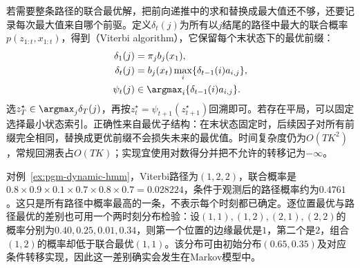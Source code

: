 若需要整条路径的联合最优解，把前向递推中的求和替换成最大值还不够，还要记录每次最大值来自哪个前驱。定义$\delta_t(j)$为所有以$j$结尾的路径中最大的联合概率$p(z_{1:t},x_{1:t})$，得到（Viterbi algorithm），它保留每个末状态下的最优前缀：
\begin{equation}
  \begin{aligned}
    \delta_1(j)&=\pi_jb_j(x_1),\\
    \delta_t(j)&=b_j(x_t)\max_i
      \{\delta_{t-1}(i)a_{i,j}\},\\
    \psi_t(j)&\in\argmax_i
      \{\delta_{t-1}(i)a_{i,j}\}.
  \end{aligned}
  \label{eq:pgm-dynamic-viterbi}
\end{equation}
选$z_T^\star\in\argmax_j\delta_T(j)$，再按$z_t^\star=\psi_{t+1}(z_{t+1}^\star)$回溯即可。若存在平局，可以固定选择最小状态索引。正确性来自最优子结构：在末状态固定时，后续因子对所有前缀完全相同，替换成更优前缀不会损失未来的最优值。时间复杂度仍为$O(TK^2)$，常规回溯表占$O(TK)$；实现宜使用对数得分并把不允许的转移记为$-\infty$。

对例~\ref{ex:pgm-dynamic-hmm}，Viterbi路径为$(1,2,2)$，联合概率是$0.8\times0.9\times0.1\times0.7\times0.8\times0.7=0.028224$，条件于观测后的路径概率约为$0.4761$。这只是所有路径中概率最高的一条，不表示每个时刻都已确定。逐位置最优与路径最优的差别也可用一个两时刻分布检验：设$(1,1),(1,2),(2,1),(2,2)$的概率分别为$0.40,0.25,0.01,0.34$，则第一个位置的边缘最优是$1$，第二个是$2$，组合$(1,2)$的概率却低于联合最优$(1,1)$。该分布可由初始分布$(0.65,0.35)$及对应条件转移实现，因此这一差别确实会发生在Markov模型中。

